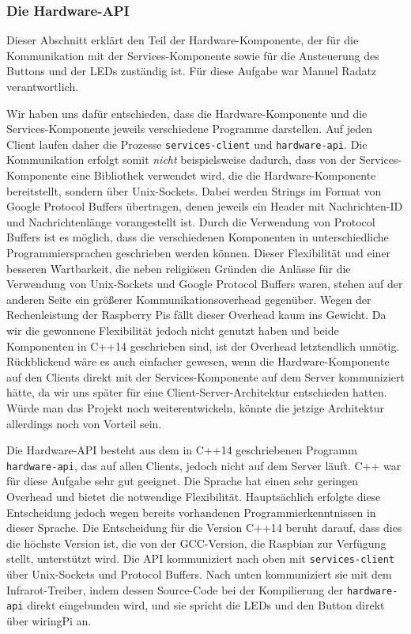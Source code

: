 \subsubsection{Die Hardware-API}

Dieser Abschnitt erklärt den Teil der Hardware-Komponente, der für die Kommunikation mit der
Services-Komponente sowie für die Ansteuerung des Buttons und der LEDs zuständig ist.
Für diese Aufgabe war Manuel Radatz verantwortlich.

Wir haben uns dafür entschieden, dass die Hardware-Komponente und die Services-Komponente jeweils
verschiedene Programme darstellen.
Auf jeden Client laufen daher die Prozesse \texttt{services-client} und \texttt{hardware-api}.
Die Kommunikation erfolgt somit \textit{nicht} beispielsweise dadurch, dass von der
Services-Komponente eine Bibliothek verwendet wird, die die Hardware-Komponente bereitstellt,
sondern über Unix-Sockets.
Dabei werden Strings im Format von Google Protocol Buffers übertragen, denen jeweils ein Header mit
Nachrichten-ID und Nachrichtenlänge vorangestellt ist.
Durch die Verwendung von Protocol Buffers ist es möglich, dass die verschiedenen Komponenten in
unterschiedliche Programmiersprachen geschrieben werden können.
Dieser Flexibilität und einer besseren Wartbarkeit, die neben religiösen Gründen die Anlässe für
die Verwendung von Unix-Sockets und Google Protocol Buffers waren, stehen auf der anderen Seite ein
größerer Kommunikationsoverhead gegenüber.
Wegen der Rechenleistung der Raspberry Pis fällt dieser Overhead kaum ins Gewicht.
Da wir die gewonnene Flexibilität jedoch nicht genutzt haben und beide Komponenten in C++14
geschrieben sind, ist der Overhead letztendlich unnötig.
Rückblickend wäre es auch einfacher gewesen, wenn die Hardware-Komponente auf den Clients direkt
mit der Services-Komponente auf dem Server kommuniziert hätte, da wir uns später für eine
Client-Server-Architektur entschieden hatten.
Würde man das Projekt noch weiterentwickeln, könnte die jetzige Architektur allerdings noch von
Vorteil sein.

Die Hardware-API besteht aus dem in C++14 geschriebenen Programm \texttt{hardware-api}, das auf
allen Clients, jedoch nicht auf dem Server läuft.
C++ war für diese Aufgabe sehr gut geeignet.
Die Sprache hat einen sehr geringen Overhead und bietet die notwendige Flexibilität.
Hauptsächlich erfolgte diese Entscheidung jedoch wegen bereits vorhandenen Programmierkenntnissen
in dieser Sprache.
Die Entscheidung für die Version C++14 beruht darauf, dass dies die höchste Version ist, die von der
GCC-Version, die Raspbian zur Verfügung stellt, unterstützt wird.
Die API kommuniziert nach oben mit \texttt{services-client} über Unix-Sockets und Protocol Buffers.
Nach unten kommuniziert sie mit dem Infrarot-Treiber, indem dessen Source-Code bei der Kompilierung
der \texttt{hardware-api} direkt eingebunden wird, und sie spricht die LEDs und den Button direkt
über wiringPi an.

